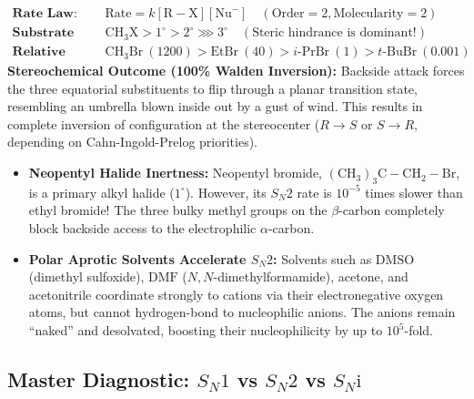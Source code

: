 \documentclass[10pt,a4paper]{article}
\begin{document}
\begin{formulabox}
\begin{align*}
  \textbf{Rate Law:} \quad & \text{Rate} = k[\mathrm{R-X}][\mathrm{Nu}^-] \quad (\text{Order} = 2, \text{Molecularity} = 2)\\
  \textbf{Substrate Reactivity:} \quad & \mathrm{CH_3X} > 1^\circ > 2^\circ \ggg 3^\circ \quad (\text{Steric hindrance is dominant!})\\
  \textbf{Relative Rates:} \quad & \mathrm{CH_3Br} \ (1200) > \mathrm{EtBr} \ (40) > i\text{-PrBr} \ (1) > t\text{-BuBr} \ (0.001)
\end{align*}
\textbf{Stereochemical Outcome (100\% Walden Inversion):}
Backside attack forces the three equatorial substituents to flip through a planar transition state, resembling an umbrella blown inside out by a gust of wind. This results in complete inversion of configuration at the stereocenter ($R \to S$ or $S \to R$, depending on Cahn-Ingold-Prelog priorities).
\end{formulabox}

\begin{trapbox}
\begin{itemize}
  \item \textbf{Neopentyl Halide Inertness:} Neopentyl bromide, $\mathrm{(CH_3)_3C-CH_2-Br}$, is a primary alkyl halide ($1^\circ$). However, its $S_N2$ rate is $10^{-5}$ times slower than ethyl bromide! The three bulky methyl groups on the $\beta$-carbon completely block backside access to the electrophilic $\alpha$-carbon.
  \item \textbf{Polar Aprotic Solvents Accelerate $S_N2$:} Solvents such as $\mathrm{DMSO}$ (dimethyl sulfoxide), $\mathrm{DMF}$ ($N,N$-dimethylformamide), acetone, and acetonitrile coordinate strongly to cations via their electronegative oxygen atoms, but cannot hydrogen-bond to nucleophilic anions. The anions remain ``naked'' and desolvated, boosting their nucleophilicity by up to $10^5$-fold.
\end{itemize}
\end{trapbox}

\subsection{Master Diagnostic: \texorpdfstring{$S_N1$}{SN1} vs \texorpdfstring{$S_N2$}{SN2} vs \texorpdfstring{$S_N\mathrm{i}$}{SNi}}
\end{document}
